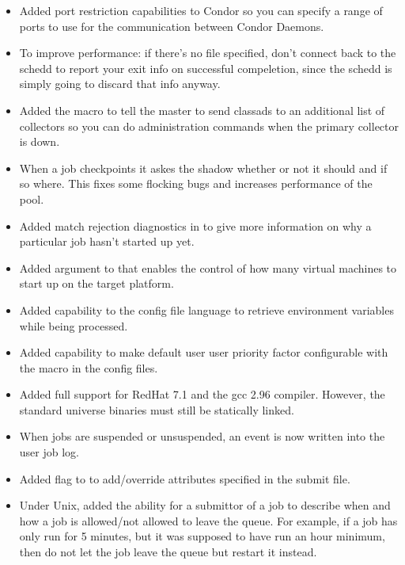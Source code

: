 \begin{itemize}
\item Added port restriction capabilities to Condor so you can specify a range
of ports to use for the communication between Condor Daemons.

\item To improve performance: if there's no  file
specified, don't connect back to the schedd to report your exit info on
successful compeletion, since the schedd is simply going to discard that
info anyway.

\item Added the macro  to tell the
master to send classads to an additional list of collectors so you can
do administration commands when the primary collector is down.

\item When a job checkpoints it askes the shadow whether or not it
should and if so where. This fixes some flocking bugs and increases
performance of the pool.

\item Added match rejection diagnostics in   to
give more information on why a particular job hasn't started up yet.

\item Added  argument to  that enables the
control of how many virtual machines to start up on the target platform.

\item Added capability to the config file language to retrieve environment
variables while being processed.

\item Added capability to make default user user priority factor configurable
with the  macro in the config files.

\item Added full support for RedHat 7.1 and the gcc 2.96 compiler. However,
the standard universe binaries must still be statically linked.

\item When jobs are suspended or unsuspended, an event is now written into
the user job log.

\item Added  flag to  to add/override attributes
specified in the submit file.

\item Under Unix, added the ability for a submittor of a job to describe when
and how a job is allowed/not allowed to leave the queue. For example, if
a job has only run for 5 minutes, but it was supposed to have run an hour 
minimum, then do not let the job leave the queue but restart it instead.


\end{itemize}
